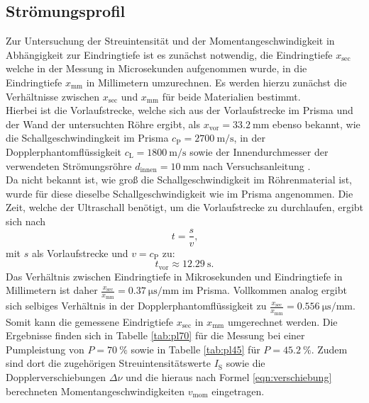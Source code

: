 \FloatBarrier

\subsection{Strömungsprofil}
Zur Untersuchung der Streuintensität und der Momentangeschwindigkeit in Abhängigkeit zur Eindringtiefe ist es zunächst notwendig, die Eindringtiefe $x_{\mathrm{sec}}$ welche in der Messung in Microsekunden aufgenommen wurde, in die Eindringtiefe $x_{\mathrm{mm}}$ in Millimetern umzurechnen.
Es werden hierzu zunächst die Verhältnisse zwischen $x_{\mathrm{sec}}$ und $x_{\mathrm{mm}}$ für beide Materialien bestimmt.\\
Hierbei ist die Vorlaufstrecke, welche sich aus der Vorlaufstrecke im Prisma und der Wand der untersuchten Röhre ergibt, als $x_\mathrm{vor}=\SI{33.2}{\milli\meter}$ ebenso bekannt, wie die Schallgeschwindingkeit im Prisma $c_\mathrm{P}=\SI{2700}{\meter\per\second}$, in der Dopplerphantomflüssigkeit $c_\mathrm{L}=\SI{1800}{\meter\per\second}$ sowie der Innendurchmesser der verwendeten Strömungsröhre $d_\mathrm{innen}=\SI{10}{\milli\meter}$ nach Versuchsanleitung \cite{Anleitung}.\\
Da nicht bekannt ist, wie groß die Schallgeschwindigkeit im Röhrenmaterial ist, wurde für diese dieselbe Schallgeschwindigkeit wie im Prisma angenommen.
Die Zeit, welche der Ultraschall benötigt, um die Vorlaufstrecke zu durchlaufen, ergibt sich nach
\begin{equation*}
  t=\frac{s}{v} \text{,}
\end{equation*}
mit $s$ als Vorlaufstrecke und $v=c_\mathrm{P}$ zu:
\begin{equation*}
    t_\mathrm{vor}\approx\SI{12.29}{\second}\text{.}
\end{equation*}
Das Verhältnis zwischen Eindringtiefe in Mikrosekunden und Eindringtiefe in Millimetern ist daher $\frac{x_\mathrm{sec}}{x_\mathrm{mm}}=\SI{0.37}{\micro\second\per\milli\meter}$ im Prisma. Vollkommen analog ergibt sich selbiges Verhältnis in der Dopplerphantomflüssigkeit zu $\frac{x_\mathrm{sec}}{x_\mathrm{mm}}=\SI{0.556}{\micro\second\per\milli\meter}$.
\\Somit kann die gemessene Eindrigtiefe $x_\mathrm{sec}$ in $x_\mathrm{mm}$ umgerechnet werden. Die Ergebnisse finden sich in Tabelle \ref{tab:pl70} für die Messung bei einer Pumpleistung von $P=\SI{70}{\percent}$ sowie in Tabelle  \ref{tab:pl45} für $P=\SI{45.2}{\percent}$.
Zudem sind dort die zugehörigen Streuintensitätswerte $I_\mathrm{S}$ sowie die Dopplerverschiebungen $\Delta \nu$ und die hieraus nach Formel \eqref{eqn:verschiebung} berechneten Momentangeschwindigkeiten $v_\mathrm{mom}$ eingetragen.


